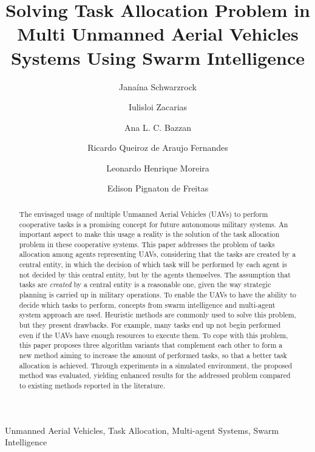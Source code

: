 \documentclass[review]{elsarticle}
\begin{document}
\begin{frontmatter}
	
\title{Solving Task Allocation Problem in Multi Unmanned Aerial Vehicles Systems Using Swarm Intelligence}

\author[ufrgsaddress]{Janaína Schwarzrock}

\author[ufrgsaddress]{Iulisloi Zacarias}

\author[ufrgsaddress]{Ana L. C. Bazzan}

\author[brazilianarmyaddress]{Ricardo Queiroz de Araujo Fernandes}

\author[brazilianarmyaddress]{Leonardo Henrique Moreira}

\author[ufrgsaddress]{Edison Pignaton de Freitas}


\address[ufrgsaddress]{Institute of Informatics Federal University of Rio Grande do Sul, Brazil}
\address[brazilianarmyaddress]{Software Development Center - Brazilian Army, Brazil}

\begin{abstract}
The envisaged usage of multiple Unmanned Aerial Vehicles (UAVs) to perform cooperative tasks is a promising concept for future autonomous military systems. An important aspect to make this usage a reality is the solution of the task allocation problem in these cooperative systems. This paper addresses the problem of tasks allocation among agents representing UAVs, considering that the tasks are created by a central entity, in which the decision of which task will be performed by each agent is not decided by this central entity, but by the agents themselves. The assumption that tasks are \textit{created} by a central entity is a reasonable one, given the way strategic planning is carried up in military operations. To enable the UAVs to have the ability to decide which tasks to perform, concepts from swarm intelligence and multi-agent system approach are used. Heuristic methods are commonly used to solve this problem, but they present drawbacks. For example, many tasks end up not begin performed even if the UAVs have enough resources to execute them. To cope with this problem, this paper proposes three algorithm variants that complement each other to form a new method aiming to increase the amount of performed tasks, so that a better task allocation is achieved. Through experiments in a simulated environment, the proposed method was evaluated, yielding enhanced results for the addressed problem compared to existing methods reported in the literature.

\end{abstract}

\begin{keyword}
Unmanned Aerial Vehicles, Task Allocation, Multi-agent Systems, Swarm Intelligence
\end{keyword}

\end{frontmatter}
\end{document}
